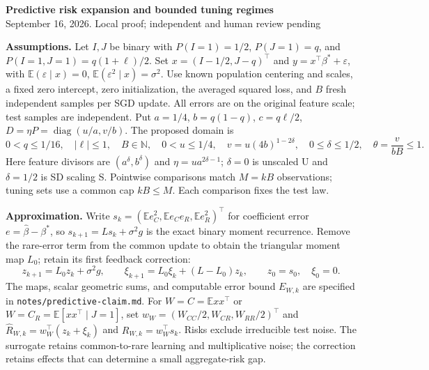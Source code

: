 \documentclass[10pt,a4paper]{article}
\newcommand{\E}{\mathbb{E}}
\newcommand{\diag}{\operatorname{diag}}
\begin{document}
\begin{center}
  {\large\bfseries Predictive risk expansion and bounded tuning regimes}\\[2pt]
  September 16, 2026. Local proof; independent and human review pending
\end{center}

\textbf{Assumptions.} Let $I,J$ be binary with $P(I = 1) = 1/2$, $P(J = 1) = q$,
and $P(I = 1,J = 1) = q(1 + \ell)/2$. Set $x = (I - 1/2,J - q)^\top$ and
$y = x^\top\beta^* + \varepsilon$, with $\E(\varepsilon \mid x) = 0$,
$\E(\varepsilon^2 \mid x) = \sigma^2$. Use known population centering and
scales, a fixed zero intercept, zero initialization, the averaged squared loss,
and $B$ fresh independent samples per SGD update. All errors are on the original
feature scale; test samples are independent. Put $a = 1/4$, $b = q(1 - q)$,
$c = q\ell/2$, $D = \eta P = \diag(u/a,v/b)$. The proposed domain is
\[
  0 < q
    \leq 1/16,\quad |\ell|
    \leq 1,\quad B
    \in \mathbb N,\quad 0
    < u
    \leq 1/4,\quad v
    = u(4b)^{1-2\delta},\quad 0
    \leq \delta
    \leq 1/2,\quad \theta
    = \frac{v}{bB}
    \leq 1.
\]
Here feature divisors are $(a^\delta,b^\delta)$ and $\eta = u a^{2\delta-1}$;
$\delta = 0$ is unscaled U and $\delta = 1/2$ is SD scaling S. Pointwise
comparisons match $M = kB$ observations; tuning sets use a common cap
$kB \leq M$. Each comparison fixes the test law.

\textbf{Approximation.} Write $s_k = (\E e_C^2,\E e_Ce_R,\E e_R^2)^\top$ for
coefficient error $e = \hat\beta - \beta^*$, so $s_{k+1} = Ls_k + \sigma^2g$ is
the exact binary moment recurrence. Remove the rare-error term from the common
update to obtain the triangular moment map $L_0$; retain its first feedback
correction:
\[
  z_{k+1} = L_0z_k + \sigma^2g,\qquad \xi_{k+1}
          = L_0\xi_k + (L - L_0)z_k,\qquad z_0
          = s_0,\quad \xi_0
          = 0.
\]
The maps, scalar geometric sums, and computable error bound $E_{W,k}$ are
specified in \texttt{notes/predictive-claim.md}. For $W = C = \E xx^\top$ or
$W = C_R = \E[xx^\top\mid J=1]$, set $w_W = (W_{CC}/2,W_{CR},W_{RR}/2)^\top$ and
$\widehat R_{W,k} = w_W^\top(z_k + \xi_k)$ and $R_{W,k} = w_W^\top s_k$. Risks
exclude irreducible test noise. The surrogate retains common-to-rare learning
and multiplicative noise; the correction retains effects that can determine a
small aggregate-risk gap.
\end{document}
